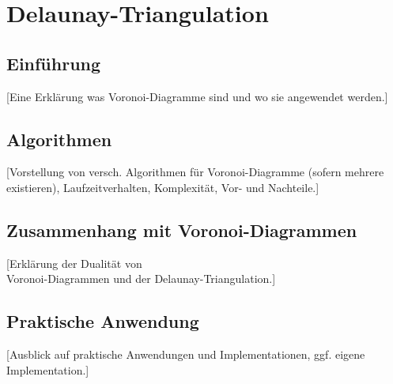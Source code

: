 \section{Delaunay-Triangulation}

\subsection{Einführung}
[Eine Erklärung was Voronoi-Diagramme sind und wo sie angewendet werden.]

\subsection{Algorithmen}
[Vorstellung von versch. Algorithmen für Voronoi-Diagramme (sofern mehrere existieren), Laufzeitverhalten, Komplexität, Vor- und Nachteile.]

\subsection{Zusammenhang mit Voronoi-Diagrammen}
[Erklärung der Dualität von \\
Voronoi-Diagrammen und der Delaunay-Triangulation.]

\subsection{Praktische Anwendung}
[Ausblick auf praktische Anwendungen und Implementationen, ggf. eigene Implementation.]

